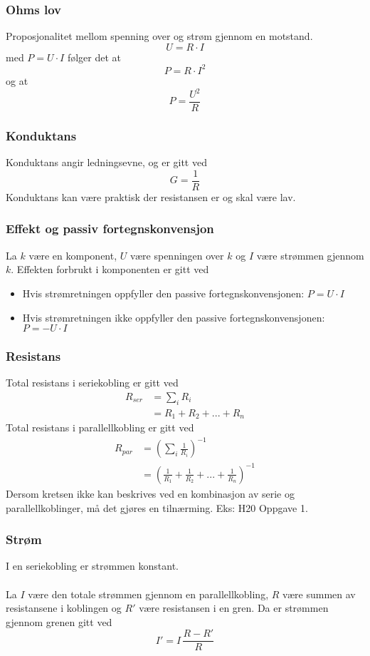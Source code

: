 \documentclass{article}
\begin{document}
\subsubsection{Ohms lov}
Proposjonalitet mellom spenning over og strøm gjennom en motstand.
\[U = R \cdot I\]
med $P = U \cdot I$ følger det at
\[P = R \cdot I^2\]
og at
\[P = \frac{U^2}{R}\]


\subsubsection{Konduktans}
Konduktans angir ledningsevne, og er gitt ved
\[G = \frac{1}{R}\]
Konduktans kan være praktisk der resistansen er og skal være lav.


\subsubsection{Effekt og passiv fortegnskonvensjon}
La $k$ være en komponent, $U$ være spenningen over $k$ og $I$ være strømmen gjennom $k$. Effekten forbrukt i komponenten er gitt ved
\begin{itemize}
    \item Hvis strømretningen oppfyller den passive fortegnskonvensjonen: $P = U \cdot I$
    \item Hvis strømretningen ikke oppfyller den passive fortegnskonvensjonen: $P = - U \cdot I$
\end{itemize}

\subsubsection{Resistans}
Total resistans i seriekobling er gitt ved
\begin{align*}
    R_{ser} &= \sum_i R_i \\
    &= R_1 + R_2 + ... + R_n
\end{align*}
Total resistans i parallellkobling er gitt ved
\begin{align*}
    R_{par} &= \left( \sum_i \frac{1}{R_i} \right)^{-1} \\
    &= \left(\frac{1}{R_1} + \frac{1}{R_2} + ... + \frac{1}{R_n}\right)^{-1}
\end{align*}
Dersom kretsen ikke kan beskrives ved en kombinasjon av serie og parallellkoblinger, må det gjøres en tilnærming. Eks: H20 Oppgave 1.


\subsubsection{Strøm}
I en seriekobling er strømmen konstant.\\\\
La $I$ være den totale strømmen gjennom en parallellkobling, $R$ være summen av resistansene i koblingen og $R'$ være resistansen i en gren. Da er strømmen gjennom grenen gitt ved
\[I' = I \, \frac{R - R'}{R}\]
\end{document}
